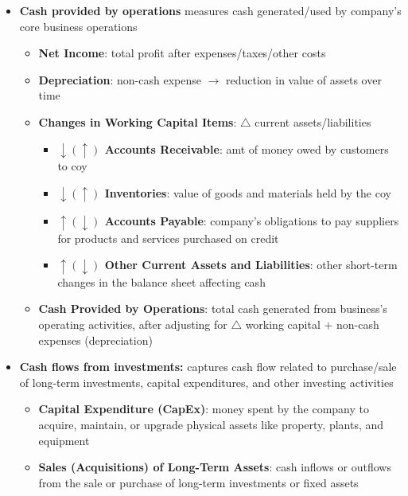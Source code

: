 \documentclass[10pt,landscape]{article}
\begin{document}
\begin{multicols*}{3}
\begin{itemize}[topsep=0pt,noitemsep,wide=0pt, leftmargin=\dimexpr{} + 2\relax]
    \item \textbf{Cash provided by operations} measures cash generated/used by company's core business operations
    \begin{itemize}[topsep=0pt,noitemsep,wide=0pt, leftmargin=\dimexpr{} + 2\relax]
        \item \textbf{Net Income}: total profit after expenses/taxes/other costs
        \item \textbf{Depreciation}: non-cash expense $\rightarrow$ reduction in value of assets over time
        \item \textbf{Changes in Working Capital Items}: $\triangle$ current assets/liabilities
        \begin{itemize}[topsep=0pt,noitemsep,wide=0pt, leftmargin=\dimexpr{} + 2\relax]
            \item \textbf{$\downarrow (\uparrow)$ Accounts Receivable}: amt of money owed by customers to coy
            \item \textbf{$\downarrow (\uparrow)$ Inventories}: value of goods and materials held by the coy
            \item \textbf{$\uparrow (\downarrow)$ Accounts Payable}: company's obligations to pay suppliers for products and services purchased on credit
            \item \textbf{$\uparrow (\downarrow)$ Other Current Assets and Liabilities}: other short-term changes in the balance sheet affecting cash
        \end{itemize}
        \item \textbf{Cash Provided by Operations}: total cash generated from business's operating activities, after adjusting for $\triangle$ working capital $+$ non-cash expenses (depreciation)
    \end{itemize}
    \item \textbf{Cash flows from investments:} captures cash flow related to purchase/sale of long-term investments, capital expenditures, and other investing activities
    \begin{itemize}[topsep=0pt,noitemsep,wide=0pt, leftmargin=\dimexpr{} + 2\relax]
        \item \textbf{Capital Expenditure (CapEx)}: money spent by the company to acquire, maintain, or upgrade physical assets like property, plants, and equipment
        \item \textbf{Sales (Acquisitions) of Long-Term Assets}: cash inflows or outflows from the sale or purchase of long-term investments or fixed assets

\end{itemize}
\end{itemize}
\end{multicols*}
\end{document}
